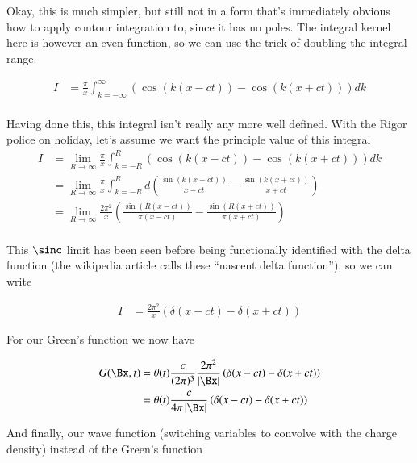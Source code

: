 Okay, this is much simpler, but still not in a form that's immediately obvious how to apply contour integration to, since it has no poles.
The integral
kernel here is however an even function,
so we can use the trick of doubling the integral range.

\begin{align*}
I &= \frac{\pi }{x} \int_{k=-\infty}^\infty \left( \cos\left( k (x-c t) \right) -\cos\left( k (x+c t) \right) \right) dk \\
\end{align*}

Having done this, this integral isn't really any more well defined.  With the Rigor police on holiday, let's assume we want the
principle value of this integral
\begin{align*}
I
&= \lim_{R \rightarrow \infty} \frac{\pi }{x} \int_{k=-R}^R \left( \cos\left( k (x-c t) \right) -\cos\left( k (x+c t) \right) \right) dk \\
&= \lim_{R \rightarrow \infty} \frac{\pi }{x} \int_{k=-R}^R d \left( \frac{\sin\left( k (x-c t) \right)}{ x - c t} - \frac{\sin\left( k (x+c t) \right)}{x + c t} \right) \\
&= \lim_{R \rightarrow \infty} \frac{2 \pi^2 }{x} \left( \frac{\sin\left( R (x-c t) \right)}{ \pi(x - c t)} - \frac{\sin\left( R (x+c t) \right)}{\pi(x + c t)} \right) \\
\end{align*}

This $\sinc$ limit has been seen before being functionally identified with the delta function (the wikipedia article calls these ``nascent delta function''), so we can write

\begin{align*}
I &= \frac{2 \pi^2 }{x} \left( \delta(x-c t) - \delta(x+c t) \right)
\end{align*}

For our Green's function we now have

\begin{align*}
G(\Bx, t)
&= \theta(t) \frac{c }{(2\pi)^3} \frac{2 \pi^2 }{\Abs{\Bx}} \left( \delta(x-c t) - \delta(x+c t) \right) \\
&= \theta(t) \frac{c }{4\pi \Abs{\Bx}} \left( \delta(x-c t) - \delta(x+c t) \right) \\
\end{align*}

And finally, our wave function (switching variables to convolve with the charge density) instead of the Green's function

